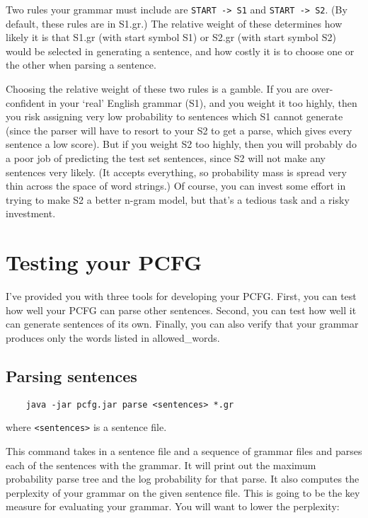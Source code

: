 \documentclass[12pt]{article}
\begin{document}
Two rules your grammar must include are \verb+START -> S1+ and \verb+START -> S2+. (By default, these rules are in S1.gr.) The relative weight of these determines how likely it is that S1.gr (with start symbol S1) or S2.gr (with start symbol S2) would be selected in generating a sentence, and how costly it is to choose one or the other when parsing a sentence.

Choosing the relative weight of these two rules is a gamble. If you are over-confident in your `real' English grammar (S1), and you weight it too highly, then you risk assigning very low probability to sentences which S1 cannot generate (since the parser will have to resort to your S2 to get a parse, which gives every sentence a low score).  But if you weight S2 too highly, then you will probably do a poor job of predicting the test set sentences, since S2 will not make any sentences very likely. (It accepts everything, so probability mass is spread very thin across the space of word strings.) Of course, you can invest some effort in trying to make S2 a better n-gram model, but that's a tedious task and a risky investment.

\section*{Testing your PCFG}
I've provided you with three tools for developing your PCFG. First, you can test how
well your PCFG can parse other sentences. Second, you can test how well it can generate
sentences of its own. Finally, you can also verify that your grammar produces only the words listed in allowed\_words.

\subsection*{Parsing sentences}

\begin{verbatim}
    java -jar pcfg.jar parse <sentences> *.gr
\end{verbatim}

where \verb+<sentences>+ is a sentence file.

This command takes in a sentence file and a sequence of grammar files and parses each of
the sentences with the grammar. It will print out the maximum probability parse tree and the
log probability for that parse. It also computes the perplexity of your grammar on the given
sentence file. This is going to be the key measure for evaluating your grammar. You will want to lower the perplexity:
\end{document}
